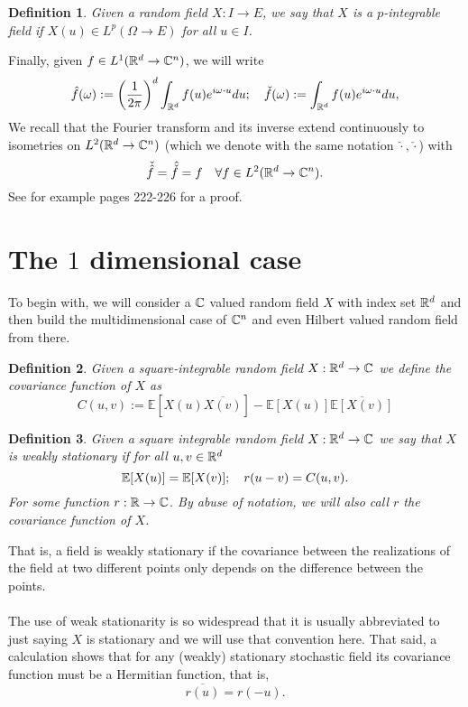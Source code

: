 \documentclass[12pt]{article}
\newtheorem{definition}{Definition}
\begin{document}
\begin{definition}
	Given a  random field $X:I\to E$, we say that $X$ is a \emph{$p$-integrable field} if $X(u)\in L^p(\Omega\to E)$ for all $u\in I$.
\end{definition}
Finally, given $f\in L^1({\mathbb R}^d\to\mathbb{C}^n)$, we will write
\begin{equation}\label{ft def}
	\hat{f}(\omega):=\qty(\frac{1}{2\pi})^d\int_{{\mathbb R}^d} f(u)e^{i\omega\cdot  u}du;\quad\check{f}(\omega):=\int_{{\mathbb R}^d} f(u)e^{i\omega\cdot  u}du,
\end{equation}
We recall that the Fourier transform and its inverse extend continuously to isometries on $L^2({\mathbb R}^d\to\mathbb{C}^n)$ (which we denote with the same notation $\hat{\cdot},\check{\cdot}$) with
\begin{equation}
	\check{\hat{f}}=\hat{\check{f}}=f\quad\forall f\in L^2({\mathbb R}^d\to\mathbb{C}^n).
\end{equation}
See for example \cite{taylor2013partial} pages 222-226 for a proof.
\section{The $1$ dimensional case}\label{1d}
To begin with, we will consider a $\mathbb{C}$ valued random field $X$ with index set ${\mathbb R}^d$ and then build the multidimensional case of $\mathbb{C}^n$ and even Hilbert valued random field from there.
\begin{definition}
	Given a square-integrable random field $X:{\mathbb R}^d\to \mathbb{C}$ we define the \emph{covariance function} of $X$ as
	\begin{equation*}
		C(u,v):=\mathbb{E}[X(u)\overline{X(v)}]-\mathbb{E}[X(u)]\overline{\mathbb{E}[X(v)]}
	\end{equation*}
\end{definition}
\begin{definition}
	Given a square integrable random field $X:{\mathbb R}^d\to\mathbb{C}$  we say that $X$ is \emph{weakly stationary} if for all $u,v\in {\mathbb R}^d$
	\begin{equation*}
		\mathbb{E}[X(u)]=\mathbb{E}[X(v)];\quad r(u-v)=C(u,v).
	\end{equation*}
	For some function $r:{\mathbb R}\to \mathbb{C}$. By abuse of notation, we will also call $r$ the covariance function of $X$.
\end{definition}
That is, a field is weakly stationary if the covariance between the realizations of the field at two different points only depends on the difference between the points.\\
\\
The use of weak stationarity is so widespread that it is usually abbreviated to just saying $X$ is stationary and we will use that convention here. That said, a calculation shows that for any (weakly) stationary stochastic field its covariance function must be a Hermitian function, that is,
\begin{equation*}
	\overline{r(u)}=r(-u).
\end{equation*}
\end{document}
